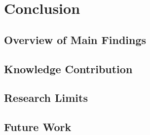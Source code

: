 \chapter{Conclusion}
\label{ch-conclusion}

\section{Overview of Main Findings}

\section{Knowledge Contribution}

\section{Research Limits}

\section{Future Work}
